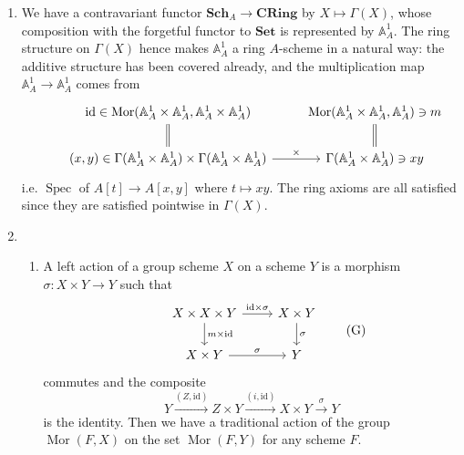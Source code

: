 \documentclass{report}
\newcommand{\cat}[1]{\mathbf{#1}} %
\newcommand{\id}{{\mathrm{id}}} %
\newcommand{\A}{\mathbb{A}}
\DeclareMathOperator{\Mor}{Mor}
\DeclareMathOperator{\Spec}{Spec}
\begin{document}
\begin{enumerate}[label=\textbf{6.6.\Alph*.}]
	\item We have a contravariant functor $\cat{Sch}_A\to\cat{CRing}$ by
	      $X\mapsto\Gamma(X)$, whose composition with the forgetful functor to
	      $\cat{Set}$ is represented by $\A^1_A$. The ring structure on
	      $\Gamma(X)$ hence makes $\A^1_A$ a ring $A$-scheme in a natural way:
	      the additive structure has been covered already, and the
	      multiplication map $\A^1_A\to\A^1_A$ comes from
	      \begin{equation*}
		      \begin{tikzcd}
			      &\id\in\Mor(\A^1_A\times\A^1_A,\A^1_A\times\A^1_A) \ar[d,equal]
			      &\Mor(\A^1_A\times\A^1_A,\A^1_A)\ni m \ar[d,equal] \\
			      &(x,y)\in\Gamma(\A^1_A\times\A^1_A)\times\Gamma(\A^1_A\times\A^1_A) \ar[r,"\times"]
			      &\Gamma(\A^1_A\times\A^1_A)\ni xy
		      \end{tikzcd}
	      \end{equation*}
	      i.e. $\Spec$ of $A[t]\to A[x,y]$ where $t\mapsto xy$. The ring axioms
	      are all satisfied since they are satisfied pointwise in $\Gamma(X)$.

	\item
	      \begin{enumerate}[label=(\alph*)]
		      \item A left action of a group scheme $X$ on a scheme $Y$ is a
		            morphism $\sigma:X\times Y\to Y$ such that
		            \begin{equation*}
			            \begin{tikzcd}
				            &X\times X\times Y \ar[r,"\id\times\sigma"] \ar[d,"m\times\id"]
				            &X\times Y \ar[d,"\sigma"] \\
				            &X\times Y \ar[r,"\sigma"]
				            &Y
			            \end{tikzcd}\tag{G}
		            \end{equation*}
		            commutes and the composite
		            \begin{equation*}
			            Y
			            \xrightarrow{(Z,\id)} Z\times Y
			            \xrightarrow{(i,\id)} X\times Y
			            \xrightarrow{\sigma} Y \tag{I}
		            \end{equation*}
		            is the identity. Then we have a traditional action of the
		            group $\Mor(F,X)$ on the set $\Mor(F,Y)$ for any scheme $F$.


\end{enumerate}
\end{enumerate}
\end{document}
